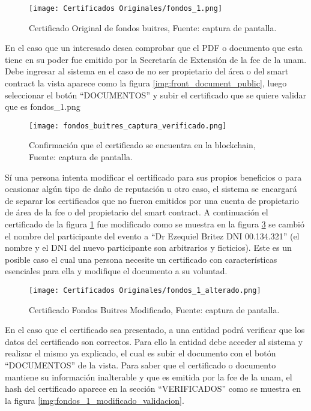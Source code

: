 \begin{figure}[H]
  \centering
  {\texttt{[image: Certificados Originales/fondos\_1.png]}}
  \caption{Certificado Original de fondos buitres,  Fuente: captura de pantalla. }
  \label{img:fondos_1}
\end{figure}

En el caso que un interesado desea comprobar que el PDF o documento que esta tiene en su poder fue emitido por la Secretaría de Extensión de la \gls{fce} de la \gls{unam}.
Debe ingresar al sistema en el caso de no ser propietario del área o del smart contract la vista aparece como la figura \ref{img:front_document_public},
luego seleccionar el botón “DOCUMENTOS” y subir el certificado que se quiere validar que es fondos\_1.png 

\begin{figure}[H]
  \centering
  {\texttt{[image: fondos\_buitres\_captura\_verificado.png]}}
  \caption{Confirmación que el certificado se encuentra en la blockchain,  Fuente: captura de pantalla. }
  \label{img:fondos_1_verificado}
\end{figure}

Sí una persona intenta modificar el certificado para sus propios beneficios o para 
ocasionar algún tipo de daño de reputación u otro caso, el sistema se encargará de separar los certificados que no fueron emitidos
por una cuenta de propietario de  área de la \gls{fce} o del propietario del smart contract. A continuación el certificado de la figura \ref{img:fondos_1} fue modificado como se muestra en la 
figura \ref{img:fondos_1_alterado} se cambió el nombre del participante del evento a “Dr Ezequiel Britez DNI 00.134.321” (el nombre y el DNI del nuevo participante son
arbitrarios y ficticios). Este es un posible caso el cual una persona necesite un certificado con características esenciales para ella y modifique 
el documento a su voluntad.

\begin{figure}[H]
  \centering
  {\texttt{[image: Certificados Originales/fondos\_1\_alterado.png]}}
  \caption{Certificado Fondos Buitres Modificado,  Fuente: captura de pantalla. }
  \label{img:fondos_1_alterado}
\end{figure}

En el caso que el certificado sea presentado, a una entidad podrá verificar  
que los datos
del certificado son correctos. Para ello la entidad debe acceder al sistema y realizar el 
mismo ya explicado, el cual es subir el documento
con el botón “DOCUMENTOS” de la vista. Para saber que el certificado o documento mantiene su información inalterable y que es emitida por la \gls{fce} de la \gls{unam},
el hash del certificado aparece en la sección “VERIFICADOS” como se muestra en la figura \ref{img:fondos_1_modificado_validacion}.

